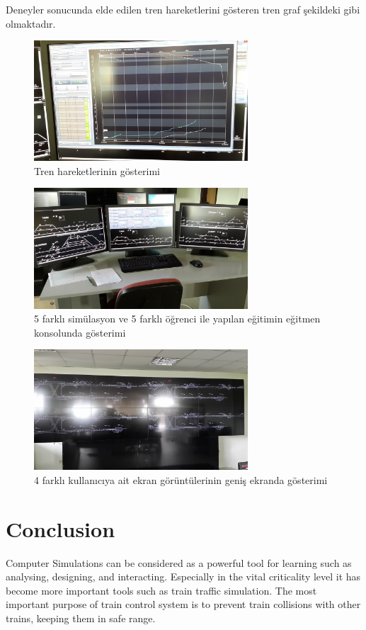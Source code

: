 \documentclass[conference]{IEEEtran}
\begin{document}
Deneyler sonucunda elde edilen tren hareketlerini gösteren tren graf şekildeki gibi olmaktadır. 
\begin{figure}[h!]
  \centering
  \includegraphics[width=8cm]{trenGrapSonuc.jpg}
  \caption{Tren hareketlerinin gösterimi}\label{fig:trenGrapSonuc}
  
\end{figure}
\begin{figure}[h!]
  \centering
  \includegraphics[width=8cm]{egitmenSonuc.jpg}
  \caption{5 farklı simülasyon ve 5 farklı öğrenci ile yapılan eğitimin eğitmen konsolunda gösterimi}\label{fig:egitmenSonuc}
  
\end{figure}
\begin{figure}[h!]
  \centering
  \includegraphics[width=8cm]{genisekranSonuc.jpg}
  \caption{4 farklı kullanıcıya ait ekran görüntülerinin geniş ekranda gösterimi}\label{fig:genisekranSonuc}
  
\end{figure}


\section{Conclusion}
Computer Simulations can be considered as a powerful tool for learning such as analysing, designing, and interacting. Especially in the vital criticality level it has become more important tools such as train traffic simulation.
The most important purpose of train control system is to prevent train collisions with other trains, keeping them in safe range.
\end{document}
